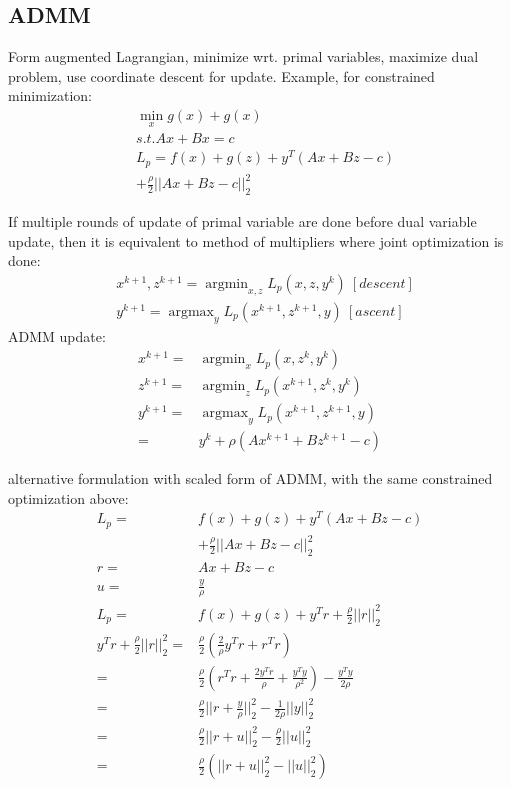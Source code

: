 \message{ !name(notebook.tex)}\documentclass[8pt]{report}
\DeclareMathOperator*{\argmin}{argmin}
\DeclareMathOperator*{\argmax}{argmax}
\begin{document}
\begin{multicols*}{2}
  \vfill\null
  \columnbreak
  
  \section{ADMM}

  Form augmented Lagrangian, minimize wrt. primal variables, maximize dual problem, use coordinate descent for update. Example, for constrained minimization:
  \begin{align*}
    & \min_x g(x) + g(x)\\
    & s.t. Ax + Bx = c\\
    & L_p = f(x) + g(z) + y^T(Ax+Bz-c)\\
    & + \frac{\rho}{2} ||Ax+Bz-c||_2^2
  \end{align*}
  
  If multiple rounds of update of primal variable are done before dual variable update, then it is equivalent to method of multipliers where joint optimization is done:
  \begin{align*}
    &x^{k+1}, z^{k+1} = \argmin_{x,z} L_p(x,z,y^k)\ [descent]\\
    &y^{k+1} = \argmax_{y} L_p(x^{k+1},z^{k+1},y)\ [ascent]
  \end{align*}
  ADMM update:
  \begin{align*}
    x^{k+1} = & \argmin_{x} L_p(x,z^k,y^k)\\
    z^{k+1} = & \argmin_{z} L_p(x^{k+1},z^k,y^k)\\
    y^{k+1} = & \argmax_{y} L_p(x^{k+1},z^{k+1},y)\\
              = & y^k + \rho(Ax^{k+1} + Bz^{k+1} -c)
  \end{align*}

  alternative formulation with scaled form of ADMM, with the same constrained optimization above:
  \begin{align*}
    L_p = & f(x) + g(z) + y^T(Ax+Bz-c)\\
          & + \frac{\rho}{2} ||Ax+Bz-c||_2^2\\
    r= & Ax+Bz-c\\
           u = & \frac{y}{\rho}\\
           L_p = & f(x) + g(z) + y^T r + \frac{\rho}{2} ||r||_2^2\\
    y^T r + \frac{\rho}{2} ||r||_2^2 = & \frac{\rho}{2}( \frac{2}{\rho} y^T r + r^T r)\\
    = & \frac{\rho}{2}(r^T r + \frac{2 y^T r}{\rho} + \frac{ y^T y}{\rho ^2}) - \frac{y^T y}{2\rho}\\
    = & \frac{\rho}{2} ||r+\frac{y}{\rho}||_2^2 - \frac{1}{2 \rho} ||y||_2^2\\
    = & \frac{\rho}{2} ||r+u||_2^2 - \frac{\rho}{2}||u||_2^2\\
    = & \frac{\rho}{2} (||r+u||_2^2 - ||u||_2^2)
  \end{align*}


\end{multicols*}
\end{document}
